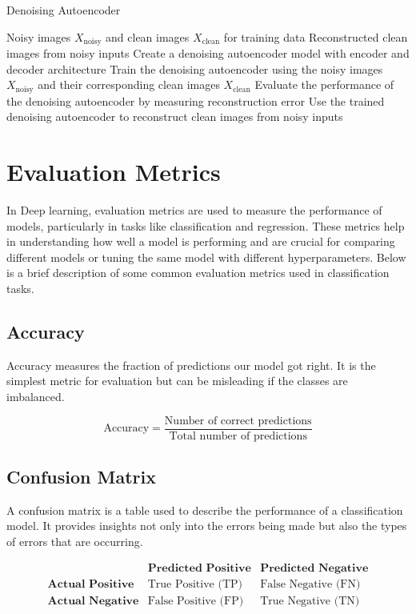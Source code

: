 \begin{algorithm}
    \caption{Denoising Autoencoder}
        \begin{algorithmic}[1]
            \Require Noisy images $X_{\text{noisy}}$ and clean images $X_{\text{clean}}$ for training data
            \Ensure Reconstructed clean images from noisy inputs
            \State Create a denoising autoencoder model with encoder and decoder architecture
            \State Train the denoising autoencoder using the noisy images $X_{\text{noisy}}$ and their corresponding clean images $X_{\text{clean}}$
            \State Evaluate the performance of the denoising autoencoder by measuring reconstruction error
            \State Use the trained denoising autoencoder to reconstruct clean images from noisy inputs
        \end{algorithmic}
\end{algorithm}


\section{Evaluation Metrics}
In Deep learning, evaluation metrics are used to measure the performance of models, particularly in tasks like classification and regression. These metrics help in understanding how well a model is performing and are crucial for comparing different models or tuning the same model with different hyperparameters. Below is a brief description of some common evaluation metrics used in classification tasks.

\subsection{Accuracy}
Accuracy measures the fraction of predictions our model got right. It is the simplest metric for evaluation but can be misleading if the classes are imbalanced.

\[
\text{Accuracy} = \frac{\text{Number of correct predictions}}{\text{Total number of predictions}}
\]

\subsection{Confusion Matrix}
A confusion matrix is a table used to describe the performance of a classification model. It provides insights not only into the errors being made but also the types of errors that are occurring.

\[
\begin{array}{c|c|c}
 & \textbf{Predicted Positive} & \textbf{Predicted Negative} \\ \hline
\textbf{Actual Positive} & \text{True Positive (TP)} & \text{False Negative (FN)} \\ \hline
\textbf{Actual Negative} & \text{False Positive (FP)} & \text{True Negative (TN)} \\
\end{array}
\]

